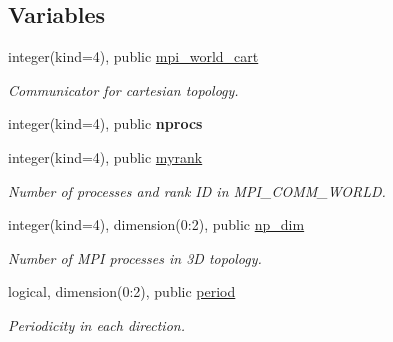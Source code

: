 \subsection*{Variables}
\begin{DoxyCompactItemize}
\item 
\mbox{\label{namespacempi__topology_a893b6fb583833278f1fd992cd4d4cbf8}} 
integer(kind=4), public \hyperlink{namespacempi__topology_a893b6fb583833278f1fd992cd4d4cbf8}{mpi\+\_\+world\+\_\+cart}
\begin{DoxyCompactList}\small\item\em Communicator for cartesian topology. \end{DoxyCompactList}\item 
\mbox{\label{namespacempi__topology_af16caa219178ffc6fb90822629db8a49}} 
integer(kind=4), public {\bfseries nprocs}
\item 
\mbox{\label{namespacempi__topology_a27f9bdf05c9c90f0c087aeb26b99a4f3}} 
integer(kind=4), public \hyperlink{namespacempi__topology_a27f9bdf05c9c90f0c087aeb26b99a4f3}{myrank}
\begin{DoxyCompactList}\small\item\em Number of processes and rank ID in M\+P\+I\+\_\+\+C\+O\+M\+M\+\_\+\+W\+O\+R\+LD. \end{DoxyCompactList}\item 
\mbox{\label{namespacempi__topology_a8f8932a2511cfd89285a6f2eb906d098}} 
integer(kind=4), dimension(0\+:2), public \hyperlink{namespacempi__topology_a8f8932a2511cfd89285a6f2eb906d098}{np\+\_\+dim}
\begin{DoxyCompactList}\small\item\em Number of M\+PI processes in 3D topology. \end{DoxyCompactList}\item 
\mbox{\label{namespacempi__topology_ac24cb383bdfbdf566165cf78b03677aa}} 
logical, dimension(0\+:2), public \hyperlink{namespacempi__topology_ac24cb383bdfbdf566165cf78b03677aa}{period}
\begin{DoxyCompactList}\small\item\em Periodicity in each direction. \end{DoxyCompactList}\item 

\end{DoxyCompactItemize}
